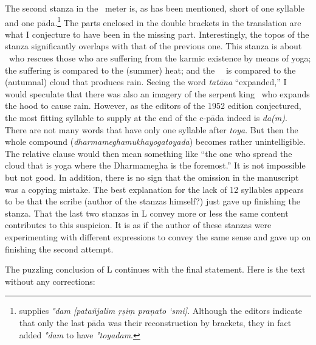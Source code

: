 The second stanza in the \rathoddhata\ meter is, as has been mentioned, short of one syllable and one pāda.\footnote{\citet[370]{yvi} supplies \emph{°dam [patañjalim ṛṣiṃ praṇato ‘smi]}. Although the editors indicate that only the last pāda was their reconstruction by brackets, they in fact added \emph{°dam} to have \emph{°toyadam}.} The parts enclosed in the double brackets in the translation are what I conjecture to have been in the missing part. Interestingly, the topos of the stanza significantly overlaps with that of the previous one. This stanza is about \Patanjali\ who rescues those who are suffering from the karmic existence by means of yoga; the suffering is compared to the (summer) heat; and the \Dharmamegha\ \samadhi\ is compared to the (autumnal) cloud that produces rain. Seeing the word \emph{tatāna} ``expanded,'' I would speculate that there was also an imagery of the serpent king \Patanjali\ who expands the hood to cause rain. However, as the editors of the 1952 edition conjectured, the most fitting syllable to supply at the end of the c-pāda indeed is \emph{da(m)}. There are not many words that have only one syllable after \emph{toya}. But then the whole compound (\emph{dharmameghamukhayogatoyada}) becomes rather unintelligible. The relative clause would then mean something like ``the one who spread the cloud that is yoga where the Dharmamegha is the foremost.'' It is not impossible but not good. In addition, there is no sign that the omission in the manuscript was a copying mistake. The best explanation for the lack of 12 syllables appears to be that the scribe (author of the stanzas himself?) just gave up finishing the stanza. That the last two stanzas in L convey more or less the same content contributes to this suspicion. It is as if the author of these stanzas were experimenting with different expressions to convey the same sense and gave up on finishing the second attempt.

The puzzling conclusion of L continues with the final statement. Here is the text without any corrections:

